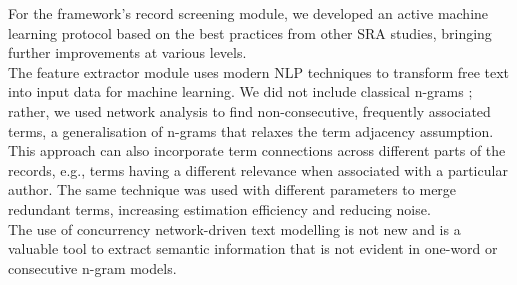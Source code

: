 \documentclass[]{bmcart}
\begin{document}
For the framework's record screening module, we developed an active
machine learning protocol \citep{settles2009active, miwa2014reducing}
based on the best practices from other SRA studies, bringing further
improvements at various levels.\\
The feature extractor module uses modern NLP techniques
\citep{ananiadou2006text, cohen2008getting} to transform free text into
input data for machine learning. We did not include classical n-grams
\citep{schonlau2017text}; rather, we used network analysis to find
non-consecutive, frequently associated terms, a generalisation of
n-grams that relaxes the term adjacency assumption. This approach can
also incorporate term connections across different parts of the records,
e.g., terms having a different relevance when associated with a
particular author. The same technique was used with different parameters
to merge redundant terms, increasing estimation efficiency and reducing
noise.\\
The use of concurrency network-driven text modelling is not new
\citep{rousseau2015graph, violos2016sentiment, rousseau2015text, ohsawa1998keygraph}
and is a valuable tool to extract semantic information that is not
evident in one-word or consecutive n-gram models.\\
\end{document}

